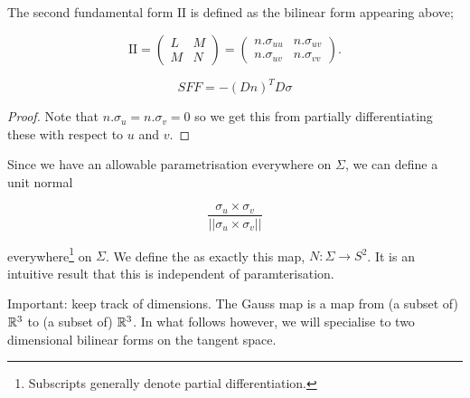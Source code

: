 \documentclass[11pt]{scrartcl}
\begin{document}
\begin{definition}
    The second fundamental form $\text{II}$ is defined as the bilinear form appearing above;

    \begin{equation}
        \text{II} = \begin{pmatrix} L & M \\ M & N \end{pmatrix} = \begin{pmatrix} n.\sigma_{uu} & n.\sigma_{uv} \\ n.\sigma_{uv} & n.\sigma_{vv} \end{pmatrix}.        
    \end{equation}
\end{definition}


\begin{theorem}

\begin{equation}
    SFF = - (Dn)^T D\sigma
\end{equation}

\begin{proof}
Note that $n . \sigma_u = n . \sigma_v = 0$ so we get this from partially differentiating these with respect to $u$ and $v$.
\end{proof}

\end{theorem}

Since we have an allowable parametrisation everywhere on $\Sigma$, we can define a unit normal

\begin{equation}
    \frac{ \sigma_u \times \sigma_v }{|| \sigma_u \times \sigma_v ||}
\end{equation}

everywhere\footnote{Subscripts generally denote partial differentiation.} on $\Sigma$. We define the  as exactly this map, $N : \Sigma \rightarrow S^2$. It is an intuitive result that this is independent of paramterisation.

\begin{remark}
Important: keep track of dimensions. The Gauss map is a map from (a subset of) $\mathbb R^3$ to (a subset of) $\mathbb R^3$. In what follows however, we will specialise to two dimensional bilinear forms on the tangent space.
\end{remark}
\end{document}
